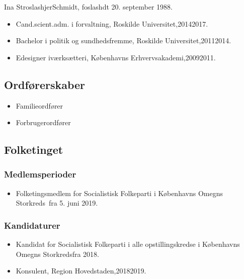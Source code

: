 \documentclass[11pt, a4paper]{awesome-cv}
\begin{document}
\makecvheader[R]
\makelettertitle
\begin{cvletter}
Ina StroslashjerSchmidt, foslashdt 20. september 1988.

\begin{itemize}
\item Cand.scient.adm. i forvaltning, Roskilde Universitet,20142017.
\item Bachelor i politik og sundhedsfremme, Roskilde Universitet,20112014.
\item Edesigner iværksætteri, Københavns Erhvervsakademi,20092011.
\end{itemize}
\subsection*{Ordførerskaber}
\begin{itemize}
\item Familieordfører
\item Forbrugerordfører
\end{itemize}
\subsection*{Folketinget}
\subsubsection*{Medlemsperioder}
\begin{itemize}
\item Folketingsmedlem for Socialistisk Folkeparti i Københavns Omegns Storkreds fra 5. juni 2019.
\end{itemize}
\subsubsection*{Kandidaturer}
\begin{itemize}
\item Kandidat for Socialistisk Folkeparti i alle opstillingskredse i Københavns Omegns Storkredsfra 2018.
\end{itemize}
\begin{itemize}
\item Konsulent, Region Hovedstaden,20182019.
\end{itemize}
\end{cvletter}
\end{document}
